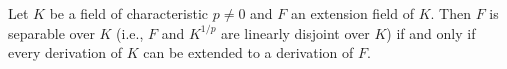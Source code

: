 Let $K$ be a field of characteristic $p \neq 0$ and $F$ an extension field of $K$. Then $F$ is separable over $K$ (i.e., $F$ and $K^{1/p}$ are linearly disjoint over $K$) if and only if every derivation of $K$ can be extended to a derivation of $F$.

